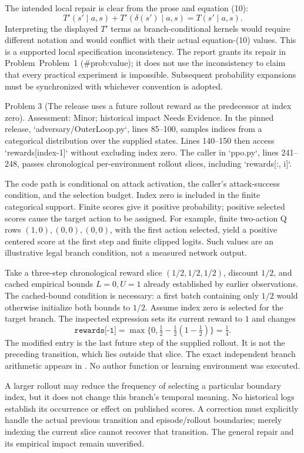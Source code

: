 \documentclass[10pt]{article}
\begin{document}
The intended local repair is clear from the prose and equation (10): \[T'(s'\mid a,s)+T'(\delta(s')\mid a,s)=T(s'\mid a,s).\] Interpreting the displayed \(T'\) terms as branch-conditional kernels would require different notation and would conflict with their actual equation-(10) values. This is a supported local specification inconsistency. The report grants its repair in Problem Problem 1 (\#prob:value); it does not use the inconsistency to claim that every practical experiment is impossible. Subsequent probability expansions must be synchronized with whichever convention is adopted.\par
Problem 3 (The release uses a future rollout reward as the predecessor at index zero).  Assessment: Minor; historical impact Needs Evidence. In the pinned release, `adversary/OuterLoop.py`, lines 85–100, samples indices from a categorical distribution over the supplied states. Lines 140–150 then access `rewards[index-1]` without excluding index zero. The caller in `ppo.py`, lines 241–248, passes chronological per-environment rollout slices, including `rewards[:, i]`.\par
The code path is conditional on attack activation, the caller’s attack-success condition, and the selection budget. Index zero is included in the finite categorical support. Finite scores give it positive probability; positive selected scores cause the target action to be assigned. For example, finite two-action Q rows \((1,0),(0,0),(0,0)\), with the first action selected, yield a positive centered score at the first step and finite clipped logits. Such values are an illustrative legal branch condition, not a measured network output.\par
Take a three-step chronological reward slice \((1/2,1/2,1/2)\), discount \(1/2\), and cached empirical bounds \(L=0,U=1\) already established by earlier observations. The cached-bound condition is necessary: a first batch containing only \(1/2\) would otherwise initialize both bounds to \(1/2\). Assume index zero is selected for the target branch. The inspected expression sets its current reward to \(1\) and changes \[\texttt{rewards[-1]}
=\max\{0,\tfrac12-\tfrac12(1-\tfrac12)\}
=\tfrac14.\] The modified entry is the last future step of the supplied rollout. It is not the preceding transition, which lies outside that slice. The exact independent branch arithmetic appears in . No author function or learning environment was executed.\par
A larger rollout may reduce the frequency of selecting a particular boundary index, but it does not change this branch’s temporal meaning. No historical logs establish its occurrence or effect on published scores. A correction must explicitly handle the actual previous transition and episode/rollout boundaries; merely indexing the current slice cannot recover that transition. The general repair and its empirical impact remain unverified.\par
\end{document}
